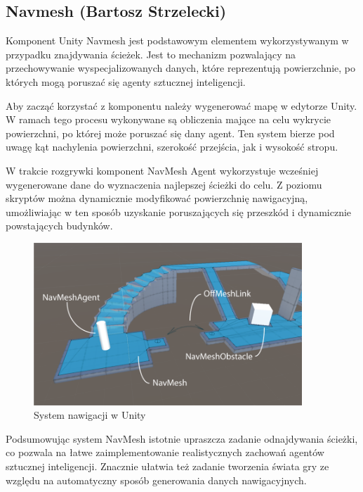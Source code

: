 \subsection{Navmesh (Bartosz Strzelecki)}

Komponent Unity Navmesh jest podstawowym elementem wykorzystywanym w przypadku znajdywania ścieżek.
Jest to mechanizm pozwalający na przechowywanie wyspecjalizowanych danych, które reprezentują
powierzchnie, po których mogą poruszać się agenty sztucznej inteligencji.

Aby zacząć korzystać z komponentu należy wygenerować mapę w edytorze Unity.
W ramach tego procesu wykonywane są obliczenia mające na celu wykrycie powierzchni,
po której może poruszać się dany agent. Ten system bierze pod uwagę kąt nachylenia
powierzchni, szerokość przejścia, jak i wysokość stropu.

W trakcie rozgrywki komponent NavMesh Agent wykorzystuje wcześniej wygenerowane dane
do wyznaczenia najlepszej ścieżki do celu. Z poziomu skryptów można dynamicznie modyfikować powierzchnię
nawigacyjną, umożliwiając w ten sposób uzyskanie poruszających się przeszkód i dynamicznie powstających budynków.

\begin{figure}[h!]
    \centering
    \includegraphics[width=0.9\textwidth]{images/navmesh.png}
    \caption{System nawigacji w Unity}
\end{figure}

Podsumowując system NavMesh istotnie upraszcza zadanie odnajdywania ścieżki, co pozwala na łatwe zaimplementowanie
realistycznych zachowań agentów sztucznej inteligencji. Znacznie ułatwia też zadanie tworzenia świata gry ze względu na automatyczny
sposób generowania danych nawigacyjnych.

